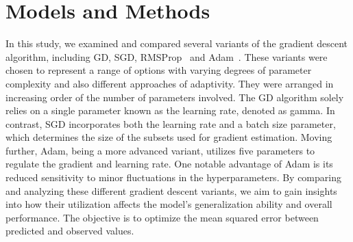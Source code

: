 \documentclass[10pt,conference,compsocconf]{IEEEtran}
\begin{document}
\section{Models and Methods}

In this study, we examined and compared several variants of the gradient descent algorithm, including GD, SGD, RMSProp~\cite{tieleman2012lecture} and Adam~\cite{kingma2017adam}. 
These variants were chosen to represent a range of options with varying degrees of parameter complexity and also different approaches of adaptivity.
They were arranged in increasing order of the number of parameters involved. 
The GD  algorithm solely relies on a single parameter known as the learning rate, denoted as gamma. 
In contrast, SGD incorporates both the learning rate and a batch size parameter, which determines the size of the subsets used for gradient estimation. 
Moving further, Adam, being a more advanced variant, utilizes five parameters to regulate the gradient and learning rate.
One notable advantage of Adam is its reduced sensitivity to minor fluctuations in the hyperparameters. 
By comparing and analyzing these different gradient descent variants, we aim to gain insights into how their utilization affects the model's generalization ability and overall performance.
The objective is to optimize the mean squared error between predicted and observed values.
\end{document}
